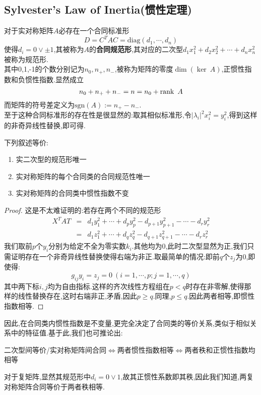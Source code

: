 \documentclass[UTF8,a4paper,notitlepage]{book}
\begin{document}
        \subsection{Sylvester's Law of Inertia(惯性定理)}
        对于实对称矩阵$A$必存在一个合同标准形$$D=C^TAC=\mathrm{diag}(d_1,\cdots,d_n)$$使得$d_i=0\lor \pm 1$,其被称为$A$的\textbf{合同规范形},其对应的二次型$d_1x_1^2+d_2x_2^2+\cdots+d_nx_n^2$被称为规范形.\\ 
        其中0,1,-1的个数分别记为$n_0,n_+,n_-$,被称为矩阵的零度$\dim(\ker~A)$,正惯性指数和负惯性指数.显然成立$$n_0+n_++n_-=n=n_0+\operatorname{rank}~A$$
        而矩阵的符号差定义为$\mathrm{sgn}(A):=n_+-n_-$.\\ 
        至于这种合同标准形的存在性是很显然的:取其相似标准形,令$|\lambda_i|^2 x_i^2=y_i^2$,得到这样的非奇异线性替换,即可得.\\ 
        \begin{theorem}[惯性定理]下列叙述等价:
            \begin{enumerate}
                \item 实二次型的规范形唯一
                \item 实对称矩阵的每个合同类的合同规范性唯一
                \item 实对称矩阵的合同类中惯性指数不变
            \end{enumerate}
        \end{theorem}
        \begin{proof}
            这是不太难证明的:若存在两个不同的规范形
            \begin{eqnarray*}
                 X^TAT&=& d_1y_1^2+\cdots+d_py_p^2-d_{p+1}y_{p+1}^2-\cdots-d_ry_r^2 \\ 
                 &=&d_1z_1^2+\cdots+d_qz_q^2-d_{q+1}z_{q+1}^2-\cdots-d_rz_r^2
            \end{eqnarray*}
            我们取前$p$个$y_i$分别为给定不全为零实数$k_i$.其他均为0,此时二次型显然为正,我们只需证明存在一个非奇异线性替换使得右端为非正.取最简单的情况:即前$q$个$z_j$为0,即使得:
            $$g_{ij}y_i=z_j=0~(i=1,\cdots,p;j=1,\cdots,q)$$其中两下标$i,j$均为自由指标.这样的齐次线性方程组在$p<q$时存在非零解,使得那样的线性替换存在,这时右端非正,矛盾,因此$p\geq q$.同理,$p\leq q$.因此两者相等,即惯性指数相等.
        \end{proof}
        因此,在合同类内惯性指数是不变量,更完全决定了合同类的等价关系,类似于相似关系中的特征值.基于此,我们也可推论出:
        \begin{corollary}
            二次型间等价/实对称矩阵间合同$\Leftrightarrow$两者惯性指数相等$\Leftrightarrow$两者秩和正惯性指数均相等
        \end{corollary}
        对于复矩阵,显然其规范形中$d_i=0\lor 1$,故其正惯性系数即其秩,因此我们知道,两复对称矩阵合同等价于两者秩相等.
\end{document}
